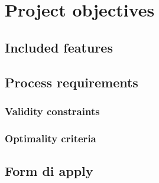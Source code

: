 
\chapter{Project objectives}
\section{Included features}
\section{Process requirements}
\subsection{Validity constraints}
\subsection{Optimality criteria}
\section{Form di apply}
